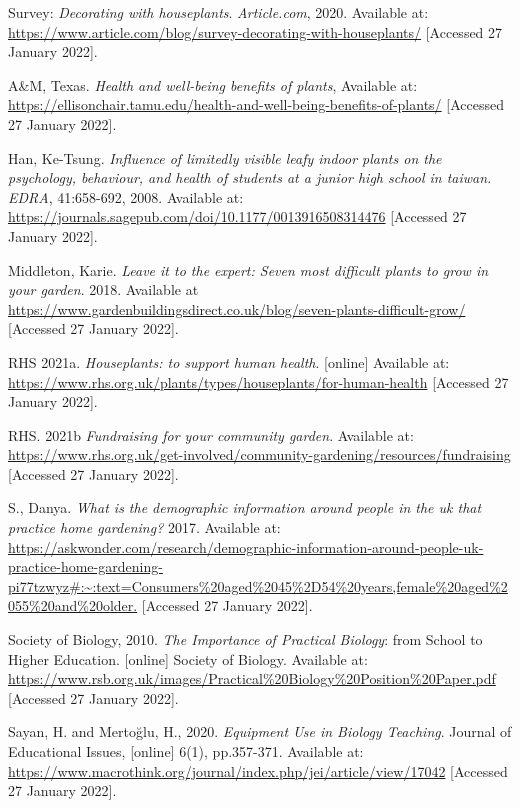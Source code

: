 \documentclass{article}
\begin{document}
\begin{thebibliography}{}
\small
{} Survey: \textit{Decorating with houseplants}. \textit{Article.com}, 2020. Available at: \url{https://www.article.com/blog/survey-decorating-with-houseplants/} [Accessed 27 January 2022].

\vspace{0.2cm}

 A\&M, Texas. \textit{Health and well-being benefits of plants}, Available at: \url{https://ellisonchair.tamu.edu/health-and-well-being-benefits-of-plants/} [Accessed 27 January 2022].

\vspace{0.2cm}

 Han, Ke-Tsung. \textit{Influence of limitedly visible leafy indoor plants on the psychology, behaviour, and health of students at a junior high school in taiwan}. \textit{EDRA}, 41:658-692, 2008. Available at: \url{https://journals.sagepub.com/doi/10.1177/0013916508314476} [Accessed 27 January 2022].

\vspace{0.2cm}

 Middleton, Karie. \textit{Leave it to the expert: Seven most difficult plants to grow in your garden}. 2018. Available at \url{https://www.gardenbuildingsdirect.co.uk/blog/seven-plants-difficult-grow/} [Accessed 27 January 2022].

\vspace{0.2cm}

 RHS 2021a. \textit{Houseplants: to support human health}. [online] Available at: \url{https://www.rhs.org.uk/plants/types/houseplants/for-human-health} [Accessed 27 January 2022].

 RHS. 2021b \textit{Fundraising for your community garden}. Available at: \url{https://www.rhs.org.uk/get-involved/community-gardening/resources/fundraising} [Accessed 27 January 2022].

 S., Danya. \textit{What is the demographic information around people in the uk that practice home gardening?} 2017. Available at: \url{https://askwonder.com/research/demographic-information-around-people-uk-practice-home-gardening-pi77tzwyz#:~:text=Consumers\%20aged\%2045\%2D54\%20years,female\%20aged\%2055\%20and\%20older.} [Accessed 27 January 2022].

 Society of Biology, 2010. \textit{The Importance of Practical Biology}: from School to Higher Education. [online] Society of Biology. Available at: \url{https://www.rsb.org.uk/images/Practical\%20Biology\%20Position\%20Paper.pdf} [Accessed 27 January 2022]. 

 Sayan, H. and Mertoğlu, H., 2020. \textit{Equipment Use in Biology Teaching}. Journal of Educational Issues, [online] 6(1), pp.357-371. Available at: \url{https://www.macrothink.org/journal/index.php/jei/article/view/17042} [Accessed 27 January 2022].

\end{thebibliography}
\end{document}
